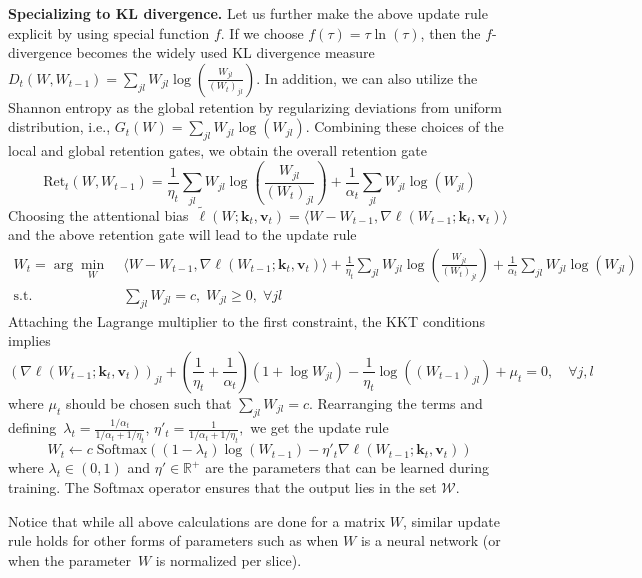 \documentclass{article}
\newcommand{\vk}[0]{\mathbf{k}}
\newcommand{\vvv}[0]{\mathbf{v}}
\newcommand{\cW}[0]{\mathcal{W}}
\theoremstyle{plain}
\theoremstyle{definition}
\theoremstyle{remark}
\begin{document}
\vspace{0.2cm}

\textbf{Specializing to KL divergence.} Let us further make the above update rule explicit by using special  function $f$. If we choose $f(\tau) = \tau \ln(\tau)$, then the $f$-divergence becomes the widely used KL divergence measure~$D_t(W,W_{t-1}) = \sum_{jl} W_{jl}\log\left(\frac{W_{jl}}{(W_t)_{jl}}\right)$. 
In addition, we can also utilize the Shannon entropy as the global retention by regularizing deviations from uniform distribution, i.e., $G_t(W) =  \sum_{jl}W_{jl}\log(W_{jl})$.  
Combining these choices of the local and global retention gates, we obtain the overall retention gate
\[
\mbox{Ret}_t(W,W_{t-1}) = \frac{1}{\eta_t} \sum_{jl} W_{jl}\log\left(\frac{W_{jl}}{(W_t)_{jl}}\right) + \frac{1}{\alpha_t} \sum_{jl}W_{jl}\log(W_{jl})
\]
Choosing the attentional bias~$\widetilde{\ell}(W;\vk_t, \vvv_t) = \langle W-W_{t-1}, \nabla \ell(W_{t-1};\vk_t, \vvv_t)\rangle$ and the above retention gate will lead to the  update rule
\begin{align}
W_{t} = \arg\min_{W} \;&\langle W-W_{t-1}, \nabla \ell(W_{t-1};\vk_t, \vvv_t)\rangle +  \frac{1}{\eta_t} \sum_{jl} W_{jl}\log\left(\frac{W_{jl}}{(W_t)_{jl}}\right) + \frac{1}{\alpha_t} \sum_{jl}W_{jl}\log(W_{jl}) \\
\textrm{s.t.}\quad & \sum_{jl}W_{jl} = c,\; W_{jl} \geq 0, \;\forall jl
\end{align}
Attaching the Lagrange multiplier to the first constraint, the KKT conditions implies
\[
\left(\nabla \ell(W_{t-1};\vk_t, \vvv_t)\right)_{jl} +\left(\frac{1}{\eta_t} + \frac{1}{\alpha_t}\right)\left(1+ \log W_{jl}\right) - \frac{1}{\eta_t} \log\left((W_{t-1})_{jl}\right) + \mu_t = 0,\quad \forall j,l
\]
where $\mu_t$ should be chosen such that $ \sum_{jl}W_{jl} = c$. Rearranging the terms and defining~$\lambda_t = \frac{1/\alpha_t}{1/\alpha_t + 1/\eta_t}$, $\eta'_t = \frac{1}{1/\alpha_t + 1/\eta_t},$  we get the update rule
\begin{equation}\label{eq:xmodel}
     W_t \leftarrow c \; \mbox{Softmax}\left( (1-\lambda_t) \log(W_{t-1})  - \eta'_t \nabla \ell(W_{t-1};\vk_t, \vvv_t)\right)
\end{equation}
where $\lambda_t \in (0,1)$ and $\eta' \in \mathbb{R}^+$ are the parameters that can be learned during training. The Softmax operator ensures that the output lies in the set $\cW$.  

Notice that while all above calculations are done for a matrix $W$, similar update rule holds for other forms of parameters such as when $W$ is a neural network (or when the parameter~$W$ is normalized per slice).
\end{document}
